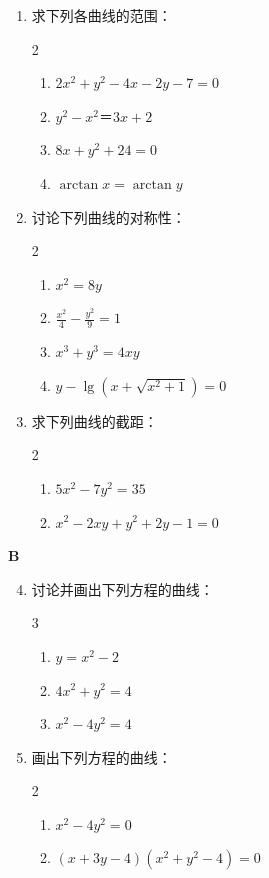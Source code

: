 \begin{enumerate}
    \item 求下列各曲线的范围：
\begin{multicols}{2}
\begin{enumerate}[(1)]
\item $2x^2+y^2-4x-2y-7=0$
\item $y^2-x^2＝3x+2$
\item $8x+y^2+24=0$
\item $\arctan x=\arctan y$
\end{enumerate}
\end{multicols}

    \item  讨论下列曲线的对称性：
\begin{multicols}{2}
\begin{enumerate}[(1)]
    \item $x^2=8y$
    \item $\frac{x^2}{4}-\frac{y^2}{9}=1$
    \item $x^3+y^3=4xy$
    \item $y-\lg\left(x+\sqrt{x^2+1}\right)=0$
\end{enumerate}    
\end{multicols}


    \item 求下列曲线的截距：
\begin{multicols}{2}
\begin{enumerate}[(1)]
    \item $5x^2-7y^2=35$
    \item $x^2-2xy+y^2+2y-1=0$
\end{enumerate}
\end{multicols}
\end{enumerate}


\begin{center}
    \bfseries B
\end{center}

\begin{enumerate}\setcounter{enumi}{3}
    \item 讨论并画出下列方程的曲线：
\begin{multicols}{3}
    \begin{enumerate}[(1)]
\item $y=x^2-2$
\item $4x^2+y^2=4$
\item $x^2-4y^2=4$
    \end{enumerate}
\end{multicols}

    \item 画出下列方程的曲线：
\begin{multicols}{2}
\begin{enumerate}[(1)]
    \item $x^2-4y^2=0$
    \item $(x+3y-4)(x^2+y^2-4)=0$
\end{enumerate}
\end{multicols}
\end{enumerate}


